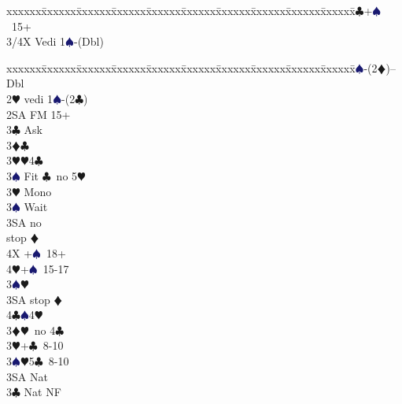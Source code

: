 \documentclass[a4paper,italian]{article}
\newcommand{\BC}{\textcolor{OliveGreen}{$\clubsuit$}}
\newcommand{\BD}{\textcolor{RedOrange}{$\vardiamondsuit$}}
\newcommand{\BH}{\textcolor{Red2}{$\varheartsuit${}}}
\newcommand{\BS}{\textcolor{MidnightBlue}{$\spadesuit${}}}
\newenvironment{bidtable}
{\begin{tabbing}

    xxxxxx\=xxxxxx\=xxxxxx\=xxxxxx\=xxxxxx\=xxxxxx\=xxxxxx\=xxxxxx\=xxxxxx\=xxxxxx\=\kill}
{\end{tabbing} }%
\begin{document}
\begin{multicols}{2}
\begin{bidtable}
                                            3\BC {}+\BS\ 15+\-\\
                                            3/4X \> Vedi 1\BS -(Dbl)\-
                                        \end{bidtable}
                                        \columnbreak
                                        \begin{bidtable}
                                            1\BS-(2\BD)--\+\\
                                            Dbl\+\\
                                            2\BH \> vedi 1\BS -(2\BC )\\
                                            2SA \> FM 15+\+\\
                                            3\BC \> Ask\+\\
                                            3\BD {}\BC \+\\
                                            3\BH {}\BH 4\BC \\
                                            3\BS \> Fit \BC\ no 5\BH \-\\
                                            3\BH \> Mono\+\\
                                            3\BS \> Wait\+\\
                                            3SA  no\+\\\-stop \BD \\
                                            4X +\BS\ 18+\\
                                            4\BH {}+\BS\ 15-17\-\-\\
                                            3\BS {}\BH \\
                                            3SA  stop \BD \\
                                            4\BC {}\BS 4\BH \-\\
                                            3\BD {}\BH\ no 4\BC \\
                                            3\BH {}+\BC\ 8-10\\
                                            3\BS {}\BH 5\BC\ 8-10\\
                                            3SA \> Nat\-\\
                                            3\BC \> Nat NF\\

\end{bidtable}
\end{multicols}
\end{document}
